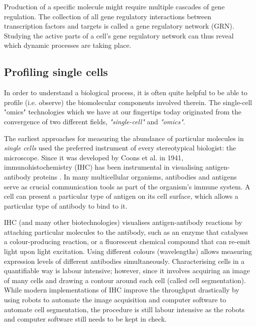 
Production of a specific molecule might require multiple cascades of gene regulation. The collection of all gene regulatory interactions between transcription factors and targets is called a gene regulatory network (GRN). Studying the active parts of a cell's gene regulatory network can thus reveal which dynamic processes are taking place. 

\subsection{Profiling single cells}
In order to understand a biological process, it is often quite helpful to be able to profile (i.e. observe) the biomolecular components involved therein. The single-cell "omics" technologies which we have at our fingertips today originated from the convergence of two different fields, \emph{"single-cell"} and \emph{"omics"}.

The earliest approaches for measuring the abundance of particular molecules in \emph{single cells} used the preferred instrument of every stereotypical biologist: the microscope.
Since it was developed by Coons et al. in 1941, immunohistochemistry (IHC) has been instrumental in visualising antigen-antibody proteins \cite{coons_immunologicalpropertiesantibody_1941}. In many multicellular organisms, antibodies and antigens serve as crucial communication tools as part of the organism's immune system. A cell can present a particular type of antigen on its cell surface, which allows a particular type of antibody to bind to it.


IHC (and many other biotechnologies) visualises antigen-antibody reactions by attaching particular molecules to the antibody, such as an enzyme that catalyses a colour-producing reaction, or a fluorescent chemical compound that can re-emit light upon light excitation. Using different colours (wavelengths) allows measuring expression levels of different antibodies simultaneously. Characterising cells in a quantifiable way is labour intensive; however, since it involves acquiring an image of many cells and drawing a contour around each cell (called cell segmentation). While modern implementations of IHC improve the throughput drastically by using robots to automate the image acquisition and computer software to automate cell segmentation, the procedure is still labour intensive as the robots and computer software still needs to be kept in check.

